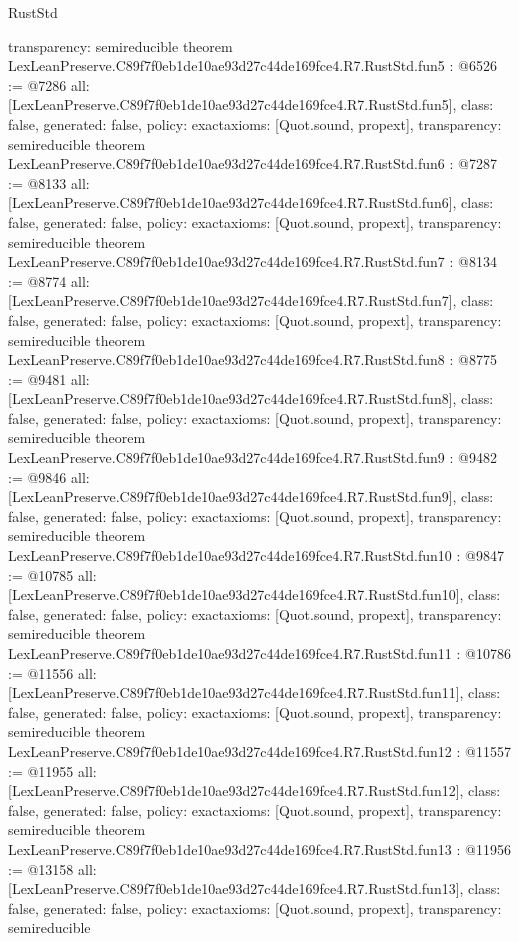 \begin{lexlean}{RustStd}
\begin{coremodule}
{  transparency: semireducible
}
theorem LexLeanPreserve.C89f7f0eb1de10ae93d27c44de169fce4.R7.RustStd.fun5 : @6526 := @7286 {
  all: [LexLeanPreserve.C89f7f0eb1de10ae93d27c44de169fce4.R7.RustStd.fun5],
  class: false,
  generated: false,
  policy: exact{axioms: [Quot.sound, propext]},
  transparency: semireducible
}
theorem LexLeanPreserve.C89f7f0eb1de10ae93d27c44de169fce4.R7.RustStd.fun6 : @7287 := @8133 {
  all: [LexLeanPreserve.C89f7f0eb1de10ae93d27c44de169fce4.R7.RustStd.fun6],
  class: false,
  generated: false,
  policy: exact{axioms: [Quot.sound, propext]},
  transparency: semireducible
}
theorem LexLeanPreserve.C89f7f0eb1de10ae93d27c44de169fce4.R7.RustStd.fun7 : @8134 := @8774 {
  all: [LexLeanPreserve.C89f7f0eb1de10ae93d27c44de169fce4.R7.RustStd.fun7],
  class: false,
  generated: false,
  policy: exact{axioms: [Quot.sound, propext]},
  transparency: semireducible
}
theorem LexLeanPreserve.C89f7f0eb1de10ae93d27c44de169fce4.R7.RustStd.fun8 : @8775 := @9481 {
  all: [LexLeanPreserve.C89f7f0eb1de10ae93d27c44de169fce4.R7.RustStd.fun8],
  class: false,
  generated: false,
  policy: exact{axioms: [Quot.sound, propext]},
  transparency: semireducible
}
theorem LexLeanPreserve.C89f7f0eb1de10ae93d27c44de169fce4.R7.RustStd.fun9 : @9482 := @9846 {
  all: [LexLeanPreserve.C89f7f0eb1de10ae93d27c44de169fce4.R7.RustStd.fun9],
  class: false,
  generated: false,
  policy: exact{axioms: [Quot.sound, propext]},
  transparency: semireducible
}
theorem LexLeanPreserve.C89f7f0eb1de10ae93d27c44de169fce4.R7.RustStd.fun10 : @9847 := @10785 {
  all: [LexLeanPreserve.C89f7f0eb1de10ae93d27c44de169fce4.R7.RustStd.fun10],
  class: false,
  generated: false,
  policy: exact{axioms: [Quot.sound, propext]},
  transparency: semireducible
}
theorem LexLeanPreserve.C89f7f0eb1de10ae93d27c44de169fce4.R7.RustStd.fun11 : @10786 := @11556 {
  all: [LexLeanPreserve.C89f7f0eb1de10ae93d27c44de169fce4.R7.RustStd.fun11],
  class: false,
  generated: false,
  policy: exact{axioms: [Quot.sound, propext]},
  transparency: semireducible
}
theorem LexLeanPreserve.C89f7f0eb1de10ae93d27c44de169fce4.R7.RustStd.fun12 : @11557 := @11955 {
  all: [LexLeanPreserve.C89f7f0eb1de10ae93d27c44de169fce4.R7.RustStd.fun12],
  class: false,
  generated: false,
  policy: exact{axioms: [Quot.sound, propext]},
  transparency: semireducible
}
theorem LexLeanPreserve.C89f7f0eb1de10ae93d27c44de169fce4.R7.RustStd.fun13 : @11956 := @13158 {
  all: [LexLeanPreserve.C89f7f0eb1de10ae93d27c44de169fce4.R7.RustStd.fun13],
  class: false,
  generated: false,
  policy: exact{axioms: [Quot.sound, propext]},
  transparency: semireducible
}
\end{coremodule}
\end{lexlean}
